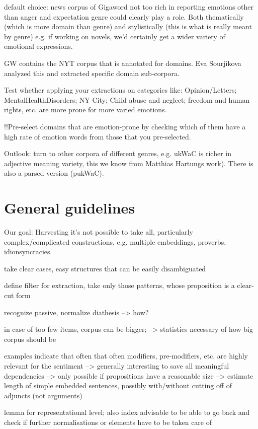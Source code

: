 default choice: news corpus of Gigaword
not too rich in reporting emotions other than anger and expectation
genre could clearly play a role.
Both thematically (which is more domain than genre) and stylistically (this is what is really meant by genre)
e.g. if working on novels, we'd certainly get a wider variety of emotional expressions.

GW contains the NYT corpus that is annotated for domains. 
Eva Sourjikova analyzed this and extracted specific domain sub-corpora. 

Test whether applying your extractions on categories like: Opinion/Letters; MentalHealthDisorders; NY City; Child abuse and neglect; freedom and human rights, etc. are more prone for more varied emotions.

!!Pre-select domains that are emotion-prone by checking which of them have a high rate of emotion words from those that you pre-selected.

Outlook: turn to other corpora of different genres, e.g. ukWaC is richer in adjective meaning variety, this we know from Matthias Hartungs work). There is also a parsed version (pukWaC).

\section{General guidelines}

Our goal: Harvesting
it's not possible to take all, particularly complex/complicated constructions, e.g. multiple embeddings, proverbs, idionsyncracies.

take clear cases, easy structures that can be easily disambiguated

define filter for extraction, take only those patterns, whose proposition is a clear-cut form

recognize passive, normalize diathesis --> how?

in case of too few items, corpus can be bigger; 
--> statistics necessary of how big corpus should be

examples indicate that often that often modifiers, pre-modifiers, etc. are highly relevant for the sentiment
--> generally interesting to save all meaningful dependencies
--> only possible if propositions have a reasonable size
--> estimate length of simple embedded sentences, possibly with/without cutting off of adjuncts (not arguments)

lemma for representational level; also index advisable to be able to go back and check if further normalisations or elements have to be taken care of

